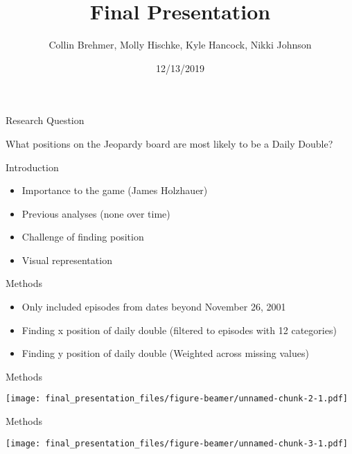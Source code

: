 \documentclass[
  ignorenonframetext,
]{beamer}
\title{Final Presentation}
\author{Collin Brehmer, Molly Hischke, Kyle Hancock, Nikki Johnson}
\date{12/13/2019}
\providecommand{\tightlist}{%
  \setlength{\itemsep}{0pt}\setlength{\parskip}{0pt}}
\begin{document}
\frame{\titlepage}

\begin{frame}

\end{frame}

\begin{frame}{Research Question}
\protect\hypertarget{research-question}{}

What positions on the Jeopardy board are most likely to be a Daily
Double?

\end{frame}

\begin{frame}{Introduction}
\protect\hypertarget{introduction}{}

\begin{itemize}
\tightlist
\item
  Importance to the game (James Holzhauer) 
\item
  Previous analyses (none over time) 
\item
  Challenge of finding position 
\item
  Visual representation
\end{itemize}

\end{frame}

\begin{frame}{Methods}
\protect\hypertarget{methods}{}

\begin{itemize}
\tightlist
\item
  Only included episodes from dates beyond November 26, 2001 
\item
  Finding x position of daily double (filtered to episodes with 12
  categories) 
\item
  Finding y position of daily double (Weighted across missing values)
\end{itemize}

\end{frame}

\begin{frame}{Methods}
\protect\hypertarget{methods-1}{}

\texttt{[image: final\_presentation\_files/figure-beamer/unnamed-chunk-2-1.pdf]}

\end{frame}

\begin{frame}{Methods}
\protect\hypertarget{methods-2}{}

\texttt{[image: final\_presentation\_files/figure-beamer/unnamed-chunk-3-1.pdf]}

\end{frame}
\end{document}
